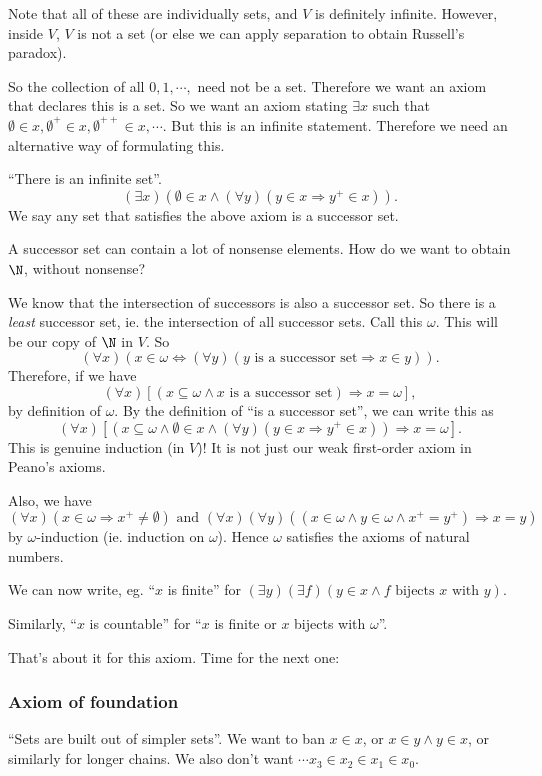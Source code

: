 \documentclass[a4paper]{article}
\begin{document}
Note that all of these are individually sets, and $V$ is definitely infinite. However, inside $V$, $V$ is not a set (or else we can apply separation to obtain Russell's paradox).

So the collection of all $0, 1, \cdots, $ need not be a set. Therefore we want an axiom that declares this is a set. So we want an axiom stating $\exists x$ such that $\emptyset\in x, \emptyset^+\in x, \emptyset^{++}\in x, \cdots$. But this is an infinite statement. Therefore we need an alternative way of formulating this.

\begin{axiom}
  ``There is an infinite set''.
  \[
    (\exists x)(\emptyset\in x \wedge (\forall y)(y\in x \Rightarrow y^+ \in x)).
  \]
  We say any set that satisfies the above axiom is a successor set.
\end{axiom}
A successor set can contain a lot of nonsense elements. How do we want to obtain $\N$, without nonsense?

We know that the intersection of successors is also a successor set. So there is a \emph{least} successor set, ie. the intersection of all successor sets. Call this $\omega$. This will be our copy of $\N$ in $V$. So
\[
  (\forall x)(x\in \omega \Leftrightarrow (\forall y)(y\text{ is a successor set} \Rightarrow  x \in y)).
\]
Therefore, if we have
\[
  (\forall x)[(x \subseteq \omega\wedge x\text{ is a successor set}) \Rightarrow  x = \omega],
\]
by definition of $\omega$. By the definition of ``is a successor set'', we can write this as
\[
  (\forall x)[(x\subseteq \omega \wedge \emptyset\in x \wedge (\forall y)(y\in x \Rightarrow  y^+ \in x))\Rightarrow  x = \omega].
\]
This is genuine induction (in $V$)! It is not just our weak first-order axiom in Peano's axioms.

Also, we have
\[
  (\forall x)(x\in \omega \Rightarrow  x^+ \not = \emptyset)\text{ and }(\forall x)(\forall y)((x\in \omega \wedge y\in \omega \wedge x^+ = y^+) \Rightarrow  x = y)
\]
by $\omega$-induction (ie. induction on $\omega$). Hence $\omega$ satisfies the axioms of natural numbers.

We can now write, eg. ``$x$ is finite'' for $(\exists y)(\exists f)(y\in x \wedge f\text{ bijects }x\text{ with }y)$.

Similarly, ``$x$ is countable'' for ``$x$ is finite or $x$ bijects with $\omega$''.

That's about it for this axiom. Time for the next one:
\subsubsection*{Axiom of foundation}
``Sets are built out of simpler sets''. We want to ban $x\in x$, or $x\in y\wedge y\in x$, or similarly for longer chains. We also don't want $\cdots x_3 \in x_2 \in x_1 \in x_0$.
\end{document}
